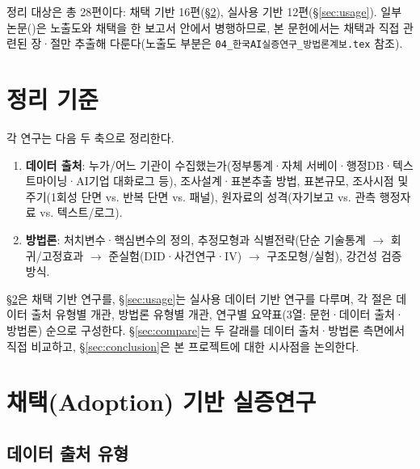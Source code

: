 \documentclass[11pt]{article}
\begin{document}
정리 대상은 총 28편이다: 채택 기반 16편(\S\ref{sec:adoption}), 실사용 기반 12편(\S\ref{sec:usage}). 일부 논문(\citealp{nam-2026-ai-macroeconomic-impact-analysis, kiet-2024-ai-labor-market-industry, chang-2024-ai-development-employment-effects, noh-2025-ai-labor-coexistence, noh-2025-ai-based-manufacturing-innovation-employment})은 노출도와 채택을 한 보고서 안에서 병행하므로, 본 문헌에서는 채택과 직접 관련된 장·절만 추출해 다룬다(노출도 부분은 \texttt{04\_한국AI실증연구\_방법론계보.tex} 참조).

\section{정리 기준}

각 연구는 다음 두 축으로 정리한다.

\begin{enumerate}[label=(\arabic*)]
  \item \textbf{데이터 출처}: 누가/어느 기관이 수집했는가(정부통계·자체 서베이·행정DB·텍스트마이닝·AI기업 대화로그 등), 조사설계·표본추출 방법, 표본규모, 조사시점 및 주기(1회성 단면 vs. 반복 단면 vs. 패널), 원자료의 성격(자기보고 vs. 관측 행정자료 vs. 텍스트/로그).
  \item \textbf{방법론}: 처치변수·핵심변수의 정의, 추정모형과 식별전략(단순 기술통계 $\to$ 회귀/고정효과 $\to$ 준실험(DID·사건연구·IV) $\to$ 구조모형/실험), 강건성 검증 방식.
\end{enumerate}

\S\ref{sec:adoption}은 채택 기반 연구를, \S\ref{sec:usage}는 실사용 데이터 기반 연구를 다루며, 각 절은 데이터 출처 유형별 개관, 방법론 유형별 개관, 연구별 요약표(3열: 문헌·데이터 출처·방법론) 순으로 구성한다. \S\ref{sec:compare}는 두 갈래를 데이터 출처·방법론 측면에서 직접 비교하고, \S\ref{sec:conclusion}은 본 프로젝트에 대한 시사점을 논의한다.

\section{채택(Adoption) 기반 실증연구}
\label{sec:adoption}

\subsection{데이터 출처 유형}
\label{sec:adoption-data}
\end{document}

